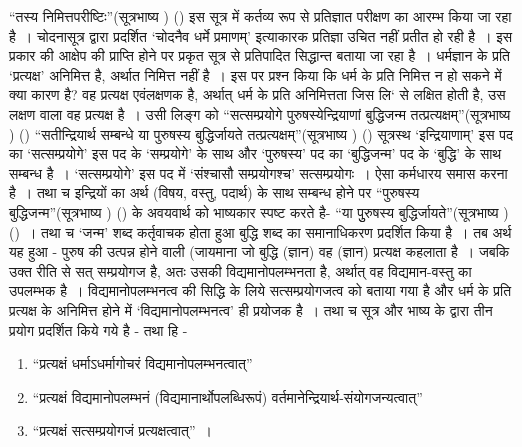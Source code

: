 “तस्य निमित्तपरीष्टिः”(सूत्रभाष्य ) () इस सूत्र में कर्तव्य रूप से प्रतिज्ञात परीक्षण का आरम्भ किया जा रहा है~। चोदनासूत्र द्वारा प्रदर्शित ‘चोदनैव धर्मे प्रमाणम्' इत्याकारक प्रतिज्ञा उचित नहीं प्रतीत हो रही है~। इस प्रकार की आक्षेप की प्राप्ति होने पर प्रकृत सूत्र से प्रतिपादित सिद्धान्त बताया जा रहा है~। धर्मज्ञान के प्रति ‘प्रत्यक्ष' अनिमित्त है, अर्थात निमित्त नहीं है~। इस पर प्रश्न किया कि धर्म के प्रति निमित्त न हो सकने में क्या कारण है? वह प्रत्यक्ष एवंलक्षणक है, अर्थात् धर्म के प्रति अनिमित्तता जिस लि‘ से लक्षित होती है, उस लक्षण वाला वह प्रत्यक्ष है~। उसी लिङ्ग को “सत्सम्प्रयोगे पुरुषस्येन्द्रियाणां बुद्धिजन्म तत्प्रत्यक्षम्”(सूत्रभाष्य ) () “सतीन्द्रियार्थ सम्बन्धे या पुरुषस्य बुद्धिर्जायते तत्प्रत्यक्षम्”(सूत्रभाष्य ) () सूत्रस्थ ‘इन्द्रियाणाम्' इस पद का ‘सत्सम्प्रयोगे' इस पद के ‘सम्प्रयोगे' के साथ और ‘पुरुषस्य' पद का ‘बुद्धिजन्म' पद के ‘बुद्धि' के साथ सम्बन्ध है~। ‘सत्सम्प्रयोगे' इस पद में ‘संश्चासौ सम्प्रयोगश्च' सत्सम्प्रयोगः~। ऐसा कर्मधारय समास करना है~। तथा च इन्द्रियों का अर्थ (विषय, वस्तु, पदार्थ) के साथ सम्बन्ध होने पर “पुरुषस्य बुद्धिजन्म”(सूत्रभाष्य ) () के अवयवार्थ को भाष्यकार स्पष्ट करते है- “या पुुरुषस्य बुद्धिर्जायते”(सूत्रभाष्य ) ()~। तथा च ‘जन्म' शब्द कर्तृवाचक होता हुआ बुद्धि शब्द का समानाधिकरण प्रदर्शित किया है~। तब अर्थ यह हुआ - पुरुष की उत्पन्न होने वाली (जायमाना जो बुद्धि (ज्ञान) वह (ज्ञान) प्रत्यक्ष कहलाता है~। जबकि उक्त रीति से सत् सम्प्रयोगज है, अतः उसकी विद्यमानोपलम्भनता है, अर्थात् वह विद्यमान-वस्तु का उपलम्भक है~। विद्यमानोपलम्भनत्व की सिद्धि के लिये सत्सम्प्रयोगजत्व को बताया गया है और धर्म के प्रति प्रत्यक्ष के अनिमित्त होने में ‘विद्यमानोपलम्भनत्व' ही प्रयोजक है~। तथा च सूत्र और भाष्य के द्वारा तीन प्रयोग प्रदर्शित किये गये है - तथा हि -
\begin{enumerate}[topsep=1pt]
\itemsep=0pt
\item “प्रत्यक्षं धर्माऽधर्मागोचरं विद्यमानोपलम्भनत्वात्”

 \item “प्रत्यक्षं विद्यमानोपलम्भनं (विद्यमानार्थोपलब्धिरूपं) वर्तमानेन्द्रियार्थ-संयोगजन्यत्वात्”

 \item “प्रत्यक्षं सत्सम्प्रयोगजं प्रत्यक्षत्वात्”~।

\end{enumerate}

